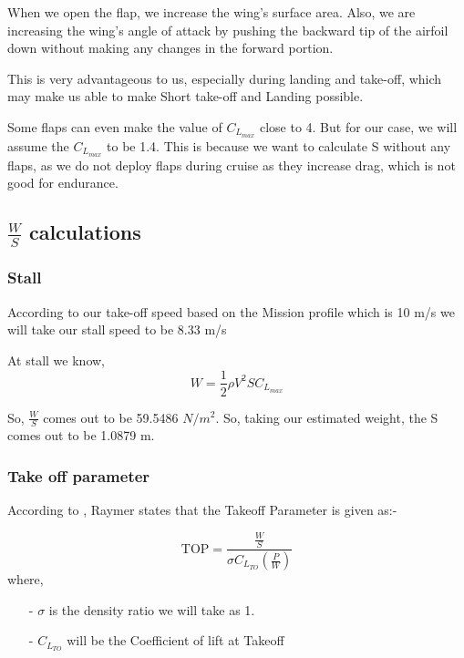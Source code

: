 \documentclass[12 pt]{article}
\begin{document}
When we open the flap, we increase the wing's surface area. Also, we are increasing the wing's angle of attack by pushing the backward tip of the airfoil down without making any changes in the forward portion.

This is very advantageous to us, especially during landing and take-off, which may make us able to make Short take-off and Landing possible. 

Some flaps can even make the value of $C_{L_{max}}$ close to 4. But for our case, we will assume the $C_{L_{max}}$ to be 1.4. This is because we want to calculate S without any flaps, as we do not deploy flaps during cruise as they increase drag, which is not good for endurance.

\subsection{ $\frac{W}{S}$ calculations }

\subsubsection{Stall}

According to our take-off speed based on the Mission profile which is 10 m/s we will take our stall speed to be 8.33 m/s

At stall we know,
$$W = \frac{1}{2} \rho V^2 S C_{L_{max}} $$

So, $\frac{W}{S}$ comes out to be 59.5486 $N/m^2$. So, taking our estimated weight, the S comes out to be 1.0879 m.


\subsubsection{Take off parameter}

According to \cite{Raymer.2006}, Raymer states that the Takeoff Parameter is given as:- 

$$\text{TOP} = \frac{\frac{W}{S}}{ \sigma C_{L_{TO}} \left( \frac{P}{W} \right) }$$
where,
\begin{itemize}
    \item[-] $\sigma$ is the density ratio we will take as 1.
    \item [-] $C_{L_{TO}}$ will be the Coefficient of lift at Takeoff 
\end{itemize}
\end{document}
